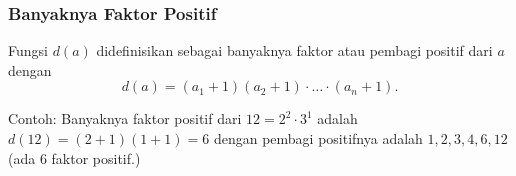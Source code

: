 \subsubsection{Banyaknya Faktor Positif}
Fungsi $d(a)$ didefinisikan sebagai banyaknya faktor atau pembagi positif dari $a$ dengan
$$d(a) = (a_1+1)(a_2+1)\cdot \ldots \cdot (a_n+1).$$

Contoh: Banyaknya faktor positif dari $12= 2^2 \cdot 3^1$ adalah $d(12)=(2+1)(1+1)=6$ dengan pembagi positifnya adalah $1,2,3,4,6,12$ (ada 6 faktor positif.)